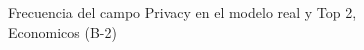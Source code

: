 \begin{figure}[H]
    \centering
    
    \caption{Frecuencia del campo Privacy en el modelo real y Top 2, Economicos (B-2)}
    \label{frecuency-Privacy-top2}
\end{figure}